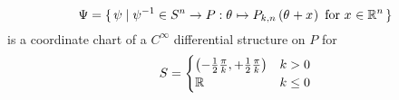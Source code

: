 \documentclass[stu, babel, american, biblatex, a4paper, leqno, draftall]{apa7}
\begin{document}
\begin{lemma}\label{M:CoordinateChart}
    \begin{equation*}
        \Psi=\set{\psi|
            \psi^{-1}
            \in S^n \to P
            :\tensor{\theta}{}\mapsto P_{k,n}\left(\tensor{\theta}{}+\tensor{x}{}\right)
            \text{ for }
            \tensor{x}{} \in \R^n
        }
    \end{equation*} is a coordinate chart of a $C^\infty$ differential structure on $P$
    for \begin{equation*}
        S=
        \begin{cases}
            \left(-\frac{1}{2}\frac{\pi}{k},+\frac{1}{2}\frac{\pi}{k}\right) & \text{$k>0$}   \\
            \mathbb{R}                                                               & \text{$k\le0$}
        \end{cases}
    \end{equation*}
\end{lemma}
\end{document}
